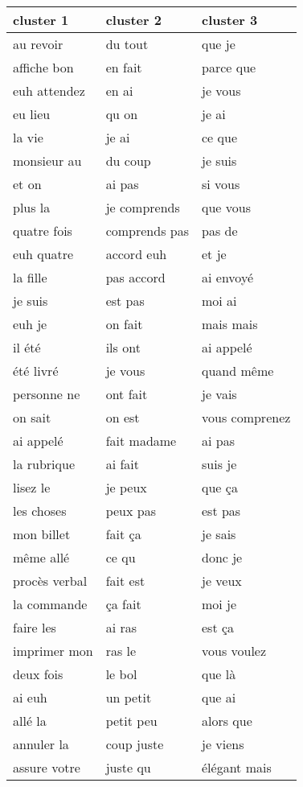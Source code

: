 \begin{table}[]
\centering
\begin{tabular}{|l|l|l|}
 \hline
 cluster 1 &cluster 2 &cluster 3 \\
 \hline
 au revoir 	& du tout 	&que je \\
 affiche bon 	& en fait 	& parce que \\
euh attendez 	& en ai 	& je vous \\
 eu lieu 	& qu on 	& je ai \\
la vie 	& je ai 	&ce que \\
 monsieur au 	& du coup 	& je suis \\
 et on 	&ai pas 	& si vous \\
 plus la 	&je comprends 	&que vous \\
 quatre fois 	& comprends pas 	&pas de \\
euh quatre 	&accord euh 	& et je \\
la fille 	&pas accord 	& ai envoyé \\
 je suis 	& est pas 	&moi ai \\
euh je 	& on fait 	& mais mais \\
il été 	& ils ont 	& ai appelé \\
 été livré 	& je vous 	&quand même \\
 personne ne 	&ont fait 	& je vais \\
 on sait 	&on est 	&vous comprenez \\
 ai appelé 	& fait madame 	&ai pas \\
 la rubrique 	& ai fait 	& suis je \\
lisez le 	& je peux 	&que ça \\
les choses 	&peux pas 	& est pas \\
mon billet 	& fait ça 	& je sais \\
 même allé 	& ce qu 	& donc je \\
 procès verbal 	&fait est 	& je veux \\
 la commande 	& ça fait 	&moi je \\
 faire les 	&ai ras 	&est ça \\
imprimer mon 	&ras le 	& vous voulez \\
 deux fois 	&le bol 	&que là \\
ai euh 	&un petit 	&que ai \\
 allé la 	& petit peu 	& alors que \\
annuler la 	&coup juste 	&je viens \\
assure votre 	&juste qu 	&élégant mais \\

\end{tabular}
\end{table}
